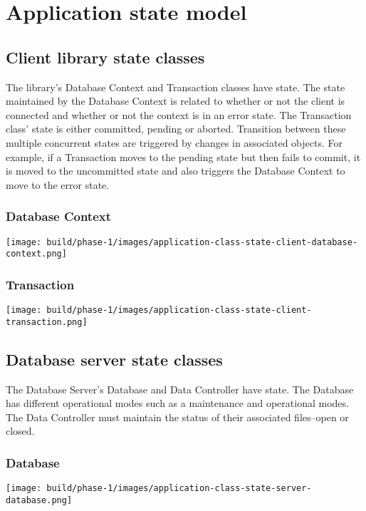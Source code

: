 \documentclass[a4paper]{report}
\begin{document}
\chapter{Application state model}

\section{Client library state classes}

	The library's Database Context and Transaction classes have state. The state maintained by the Database Context is related to whether or not the client is connected and whether or not the context is in an error state. The Transaction class' state is either committed, pending or aborted. Transition between these multiple concurrent states are triggered by changes in associated objects. For example, if a Transaction moves to the pending state but then fails to commit, it is moved to the uncommitted state and also triggers the Database Context to move to the error state.

	\pagebreak

	\subsection{Database Context}
		\texttt{[image: build/phase-1/images/application-class-state-client-database-context.png]}
	\subsection{Transaction}
		\texttt{[image: build/phase-1/images/application-class-state-client-transaction.png]}

	\pagebreak

\section{Database server state classes}

	The Database Server's Database and Data Controller have state. The Database has different operational modes such as a maintenance and operational modes. The Data Controller must maintain the status of their associated files--open or closed.

	\subsection{Database}
		\texttt{[image: build/phase-1/images/application-class-state-server-database.png]}
\end{document}
